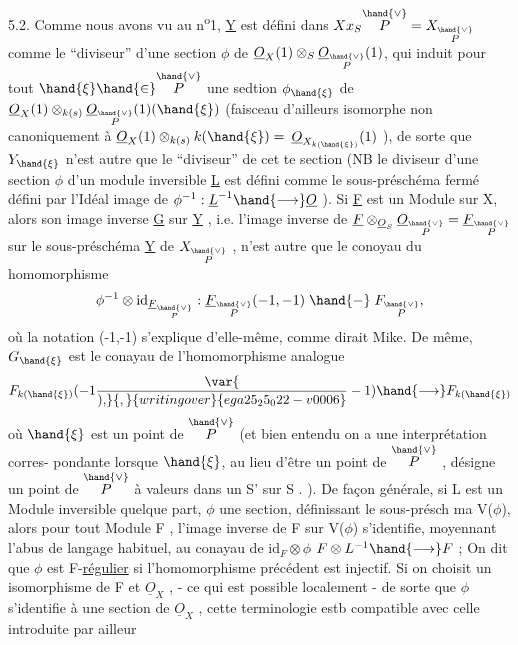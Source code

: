 5.2. Comme nous avons vu au n\textsuperscript{o}1, \underline{Y} est d\'efini dans $X x_S \overset{\hand{\vee}}{P} = X_{\overset{\hand{\vee}}{P}}$
comme le ``diviseur'' d'une section $\phi$ de $\underline{O}_X(1)\otimes_S \underline{O}_{\overset{\hand{\vee}}{P}}(1)$, qui induit pour
tout $\hand{\xi} \hand{\in} \overset{\hand{\vee}}{P}$ une sedtion $\phi_{\hand{\xi}}$ de  $\underline{O}_X(1)\otimes_{k(s)}\underline{O}_{\overset{\hand{\vee}}{P}}(1)(\hand{\xi})$
(faisceau d'ailleurs isomorphe non canoniquement \`a $\underline{O}_X(1)\otimes_{k(s)}k(\hand{\xi}) =$
$\underline{O}_{X_{k(\hand{\xi})}}(1)$ ), de sorte que $Y_{\hand{\xi}}$ n'est autre que le  ``diviseur'' de cet
te section (NB le diviseur d'une section $\phi$ d'un module inversible \underline{L} 
est d\'efini comme le sous-pr\'esch\'ema ferm\'e d\'efini par l'Id\'eal image de
$\phi^{-1} : \underline{L}^{-1} \hand{\longrightarrow} \underline{O}$ ). Si \underline{F} est un Module sur X, alors son image inverse \underline{G}
sur \underline{Y} , i.e. l'image inverse de $\underline{F}\otimes_{\underline{O}_S}\underline{O}_{\overset{\hand{\vee}}{P}} = \underline{F}_{\overset{\hand{\vee}}{P}}$ sur le sous-pr\'esch\'ema \underline{Y} de
$X_{\overset{\hand{\vee}}{P}}$ , n'est autre que le conoyau du homomorphisme
\[ \phi^{-1}\otimes \mathrm{id}_{\underline{F}_{\overset{\hand{\vee}}{P}}} : \underline{F}_{\overset{\hand{\vee}}{P}}(-1,-1) \mathrel{\hand{-}} F_{\overset{\hand{\vee}}{P}} , \]
o\`u la notation (-1,-1) s'explique d'elle-m\^eme, comme dirait Mike. De
m\^eme, $G_{\hand{\xi}}$ est le conayau de l'homomorphisme analogue
\[ F_{k(\hand{\xi})}(-1\var{\over{)}{,}}{,}{writing over}{ega25_25_022-v0006}-1) \hand{\longrightarrow} F_{k(\hand{\xi})} \]
o\`u $\hand{\xi}$ est un point de $\overset{\hand{\vee}}{P}$ (et bien entendu on a une interpr\'etation corres-%
pondante lorsque $\hand{\xi}$, au lieu d'\^etre un point de $\overset{\hand{\vee}}{P}$ , d\'esigne un point
de $\overset{\hand{\vee}}{P}$ \`a valeurs dans un S' sur S . ). \hand{\unsure{(}}De fa\c{c}on g\'en\'erale, si L est un
Module inversible quelque part, $\phi$ une section, d\'efinissant le sous-pr\'esch
ma V($\phi$), alors pour tout Module F , l'image inverse de F sur V($\phi$)
s'identifie, moyennant l'abus de langage habituel, au conayau de $\mathrm{id}_F\otimes\phi$
$F\otimes L^{-1} \hand{\longrightarrow} F$ ; On dit que $\phi$ est F-\uline{r\'egulier} si l'homomorphisme pr\'ec\'edent
est injectif. Si on choisit un isomorphisme de F et $\underline{O}_X$ , - ce qui
est possible localement - de sorte que $\phi$ s'identifie \`a une section de
$\underline{O}_X$ , cette terminologie estb compatible avec celle  introduite par ailleur

